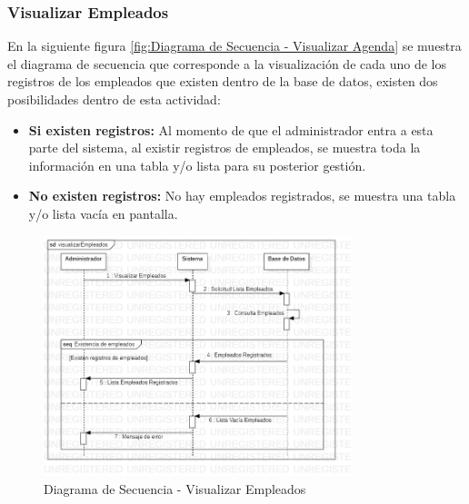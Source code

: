 \subsubsection{Visualizar Empleados}
En la siguiente figura \ref{fig:Diagrama de Secuencia - Visualizar Agenda} se muestra el diagrama de secuencia que corresponde a la visualización de cada uno de los registros de los empleados que existen dentro de la base de datos, existen dos posibilidades dentro de esta actividad:
\begin{itemize}
	\item \textbf{Si existen registros:} Al momento de que el administrador entra a esta parte del sistema, al existir registros de empleados, se muestra toda la información en una tabla y/o lista para su posterior gestión.  
	\item \textbf{No existen registros:} No hay empleados registrados, se muestra una tabla y/o lista vacía en pantalla.
\end{itemize}
\begin{figure}[!h]
	\centering
	\includegraphics[width=0.8\textwidth]{./diseno/vprocesos/imagenes/visualizarEmpleados}
	\caption{Diagrama de Secuencia - Visualizar Empleados}
	\label{fig:Diagrama de Secuencia - Visualizar Empleados}
\end{figure}